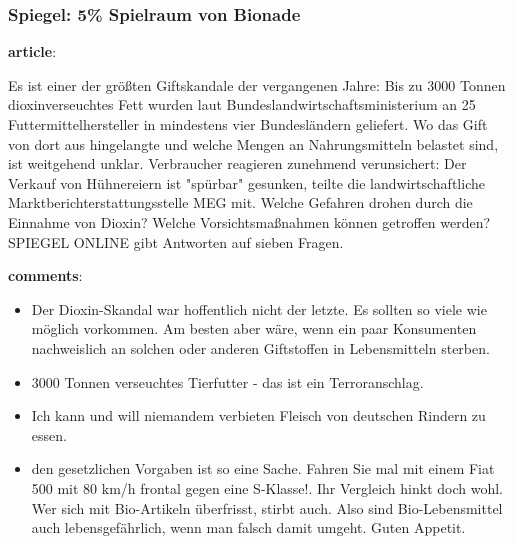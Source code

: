 \documentclass{tum-presentation}
\begin{document}
\begin{frame}
  \frametitle{ Spiegel: 5\% Spielraum von Bionade }
  \begin{description}
    \item \textbf{article}:
    \item Es ist einer der größten Giftskandale der vergangenen Jahre: Bis zu 3000 Tonnen dioxinverseuchtes Fett wurden laut Bundeslandwirtschaftsministerium an 25 Futtermittelhersteller in mindestens vier Bundesländern geliefert. Wo das Gift von dort aus hingelangte und welche Mengen an Nahrungsmitteln belastet sind, ist weitgehend unklar. Verbraucher reagieren zunehmend verunsichert: Der Verkauf von Hühnereiern ist "spürbar" gesunken, teilte die landwirtschaftliche Marktberichterstattungsstelle MEG mit. Welche Gefahren drohen durch die Einnahme von Dioxin? Welche Vorsichtsmaßnahmen können getroffen werden? SPIEGEL ONLINE gibt Antworten auf sieben Fragen.
    \item \textbf{comments}:
    \item  \begin{itemize}
      \item  Der Dioxin-Skandal war hoffentlich nicht der letzte. Es sollten so viele wie möglich vorkommen. Am besten aber wäre, wenn ein paar Konsumenten nachweislich an solchen oder anderen Giftstoffen in Lebensmitteln sterben.
      \item 3000 Tonnen verseuchtes Tierfutter - das ist ein Terroranschlag.
      \item Ich kann und will niemandem verbieten Fleisch von deutschen Rindern zu essen.
      \item den gesetzlichen Vorgaben ist so eine Sache. Fahren Sie mal mit einem Fiat 500 mit 80 km/h frontal gegen eine S-Klasse!. Ihr Vergleich hinkt doch wohl. Wer sich mit Bio-Artikeln überfrisst, stirbt auch. Also sind Bio-Lebensmittel auch lebensgefährlich, wenn man falsch damit umgeht. Guten Appetit.
      
    \end{itemize}
   \end{description}
\end{frame}
\end{document}
